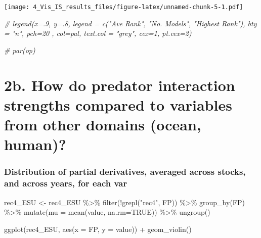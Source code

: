 \documentclass[
]{article}
\newenvironment{Shaded}{\begin{snugshade}}{\end{snugshade}}
\newcommand{\AttributeTok}[1]{\textcolor[rgb]{0.77,0.63,0.00}{#1}}
\newcommand{\CommentTok}[1]{\textcolor[rgb]{0.56,0.35,0.01}{\textit{#1}}}
\newcommand{\ConstantTok}[1]{\textcolor[rgb]{0.00,0.00,0.00}{#1}}
\newcommand{\FunctionTok}[1]{\textcolor[rgb]{0.00,0.00,0.00}{#1}}
\newcommand{\NormalTok}[1]{#1}
\newcommand{\OtherTok}[1]{\textcolor[rgb]{0.56,0.35,0.01}{#1}}
\newcommand{\SpecialCharTok}[1]{\textcolor[rgb]{0.00,0.00,0.00}{#1}}
\newcommand{\StringTok}[1]{\textcolor[rgb]{0.31,0.60,0.02}{#1}}
\begin{document}
\texttt{[image: 4\_Vis\_IS\_results\_files/figure-latex/unnamed-chunk-5-1.pdf]}

\begin{Shaded}
\begin{Highlighting}[]
\CommentTok{\# legend(x=.9, y=.8, legend = c("Ave Rank", "No. Models", "Highest Rank"), bty = "n", pch=20 , col=pal, text.col = "grey", cex=1, pt.cex=2)}


\CommentTok{\# par(op)}
\end{Highlighting}
\end{Shaded}

\hypertarget{b.-how-do-predator-interaction-strengths-compared-to-variables-from-other-domains-ocean-human}{%
\section{2b. How do predator interaction strengths compared to variables
from other domains (ocean,
human)?}\label{b.-how-do-predator-interaction-strengths-compared-to-variables-from-other-domains-ocean-human}}

\hypertarget{distribution-of-partial-derivatives-averaged-across-stocks-and-across-years-for-each-var}{%
\subsubsection{Distribution of partial derivatives, averaged across
stocks, and across years, for each
var}\label{distribution-of-partial-derivatives-averaged-across-stocks-and-across-years-for-each-var}}

\begin{Shaded}
\begin{Highlighting}[]
\NormalTok{rec4\_ESU }\OtherTok{\textless{}{-}}\NormalTok{  rec4\_ESU }\SpecialCharTok{\%\textgreater{}\%} 
  \FunctionTok{filter}\NormalTok{(}\SpecialCharTok{!}\FunctionTok{grepl}\NormalTok{(}\StringTok{"rec4"}\NormalTok{, FP)) }\SpecialCharTok{\%\textgreater{}\%} 
  \FunctionTok{group\_by}\NormalTok{(FP) }\SpecialCharTok{\%\textgreater{}\%} 
  \FunctionTok{mutate}\NormalTok{(}\AttributeTok{mu =} \FunctionTok{mean}\NormalTok{(value, }\AttributeTok{na.rm=}\ConstantTok{TRUE}\NormalTok{)) }\SpecialCharTok{\%\textgreater{}\%}
  \FunctionTok{ungroup}\NormalTok{()}

\FunctionTok{ggplot}\NormalTok{(rec4\_ESU, }\FunctionTok{aes}\NormalTok{(}\AttributeTok{x =}\NormalTok{ FP, }\AttributeTok{y =}\NormalTok{ value)) }\SpecialCharTok{+} 
  \FunctionTok{geom\_violin}\NormalTok{()}
\end{Highlighting}
\end{Shaded}
\end{document}
